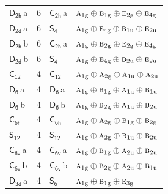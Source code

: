\documentclass[10pt,a4paper]{article}
\numberwithin{equation}{section}
\newcommand{\grp}[1]{\mathsf{#1}}
\newcommand{\irr}[1]{\text{\normalfont\scshape #1}}
\newcommand{\ptag}[1]{\mathrm{#1}}
\newcommand{\clsletter}[1]{\,{\scriptsize\color{black!55}#1}}
\newlength{\fillwidth}\newlength{\cellwidth}\newlength{\colwidth}
\begin{document}
{\begin{longtable}{@{}lrl>{\RaggedRight\arraybackslash}p{\fillwidth}@{}}
\href{D2h.pdf}{$\grp{D_{2h}}$}\clsletter{a} & 6 & \href{C2h.pdf}{$\grp{C_{2h}}$}\clsletter{a} & $\irr{a}_{1\ptag{g}}\oplus \irr{b}_{1\ptag{g}}\oplus \irr{e}_{2\ptag{g}}\oplus \irr{e}_{4\ptag{g}}$\\
\href{D2d.pdf}{$\grp{D_{2d}}$}\clsletter{a} & 6 & \href{S4.pdf}{$\grp{S_{4}}$} & $\irr{a}_{1\ptag{g}}\oplus \irr{e}_{4\ptag{g}}\oplus \irr{b}_{1\ptag{u}}\oplus \irr{e}_{2\ptag{u}}$\\
\href{D2h.pdf}{$\grp{D_{2h}}$}\clsletter{b} & 6 & \href{C2h.pdf}{$\grp{C_{2h}}$}\clsletter{a} & $\irr{a}_{1\ptag{g}}\oplus \irr{b}_{2\ptag{g}}\oplus \irr{e}_{2\ptag{g}}\oplus \irr{e}_{4\ptag{g}}$\\
\href{D2d.pdf}{$\grp{D_{2d}}$}\clsletter{b} & 6 & \href{S4.pdf}{$\grp{S_{4}}$} & $\irr{a}_{1\ptag{g}}\oplus \irr{e}_{4\ptag{g}}\oplus \irr{b}_{2\ptag{u}}\oplus \irr{e}_{2\ptag{u}}$\\
\href{C12.pdf}{$\grp{C_{12}}$} & 4 & \href{C12.pdf}{$\grp{C_{12}}$} & $\irr{a}_{1\ptag{g}}\oplus \irr{a}_{2\ptag{g}}\oplus \irr{a}_{1\ptag{u}}\oplus \irr{a}_{2\ptag{u}}$\\
\href{D6.pdf}{$\grp{D_{6}}$}\clsletter{a} & 4 & \href{D6.pdf}{$\grp{D_{6}}$}\clsletter{a} & $\irr{a}_{1\ptag{g}}\oplus \irr{b}_{1\ptag{g}}\oplus \irr{a}_{1\ptag{u}}\oplus \irr{b}_{1\ptag{u}}$\\
\href{D6.pdf}{$\grp{D_{6}}$}\clsletter{b} & 4 & \href{D6.pdf}{$\grp{D_{6}}$}\clsletter{b} & $\irr{a}_{1\ptag{g}}\oplus \irr{b}_{2\ptag{g}}\oplus \irr{a}_{1\ptag{u}}\oplus \irr{b}_{2\ptag{u}}$\\
\href{C6h.pdf}{$\grp{C_{6h}}$} & 4 & \href{C6h.pdf}{$\grp{C_{6h}}$} & $\irr{a}_{1\ptag{g}}\oplus \irr{a}_{2\ptag{g}}\oplus \irr{b}_{1\ptag{g}}\oplus \irr{b}_{2\ptag{g}}$\\
\href{S12.pdf}{$\grp{S_{12}}$} & 4 & \href{S12.pdf}{$\grp{S_{12}}$} & $\irr{a}_{1\ptag{g}}\oplus \irr{a}_{2\ptag{g}}\oplus \irr{b}_{1\ptag{u}}\oplus \irr{b}_{2\ptag{u}}$\\
\href{C6v.pdf}{$\grp{C_{6v}}$}\clsletter{a} & 4 & \href{C6v.pdf}{$\grp{C_{6v}}$}\clsletter{a} & $\irr{a}_{1\ptag{g}}\oplus \irr{b}_{1\ptag{g}}\oplus \irr{a}_{2\ptag{u}}\oplus \irr{b}_{2\ptag{u}}$\\
\href{C6v.pdf}{$\grp{C_{6v}}$}\clsletter{b} & 4 & \href{C6v.pdf}{$\grp{C_{6v}}$}\clsletter{b} & $\irr{a}_{1\ptag{g}}\oplus \irr{b}_{2\ptag{g}}\oplus \irr{a}_{2\ptag{u}}\oplus \irr{b}_{1\ptag{u}}$\\
\href{D3d.pdf}{$\grp{D_{3d}}$}\clsletter{a} & 4 & \href{S6.pdf}{$\grp{S_{6}}$} & $\irr{a}_{1\ptag{g}}\oplus \irr{b}_{1\ptag{g}}\oplus \irr{e}_{3\ptag{g}}$\\

\end{longtable}}
\end{document}
